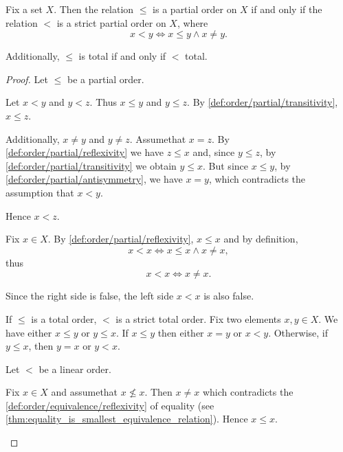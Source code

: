 \begin{proposition}\label{thm:strict_partial_order_conversion}
  Fix a set \( X \). Then the relation \( \leq \) is a partial order on \( X \) if and only if the relation \( < \) is a strict partial order on \( X \), where
  \begin{equation*}
    x < y \iff x \leq y \land x \neq y.
  \end{equation*}

  Additionally, \( \leq \) is total if and only if \( < \) total.
\end{proposition}
\begin{proof}
  \Implies Let \( \leq \) be a partial order.
  \begin{description}
     Let \( x < y \) and \( y < z \). Thus \( x \leq y \) and \( y \leq z \). By \ref{def:order/partial/transitivity}, \( x \leq z \).

    Additionally, \( x \neq y \) and \( y \neq z \). Assume\LEM that \( x = z \). By \ref{def:order/partial/reflexivity} we have \( z \leq x \) and, since \( y \leq z \), by \ref{def:order/partial/transitivity} we obtain \( y \leq x \). But since \( x \leq y \), by \ref{def:order/partial/antisymmetry}, we have \( x = y \), which contradicts the assumption that \( x < y \).

    Hence \( x < z \).

     Fix \( x \in X \). By \ref{def:order/partial/reflexivity}, \( x \leq x \) and by definition,
    \begin{equation*}
      x < x \iff x \leq x \land x \neq x,
    \end{equation*}
    thus
    \begin{equation*}
      x < x \iff x \neq x.
    \end{equation*}

    Since the right side is false, the left side \( x < x \) is also false.

     If \( \leq \) is a total order, \( < \) is a strict total order. Fix two elements \( x, y \in X \). We have either \( x \leq y \) or \( y \leq x \). If \( x \leq y \) then either \( x = y \) or \( x < y \). Otherwise, if \( y \leq x \), then \( y = x \) or \( y < x \).
  \end{description}

  \ImpliedBy Let \( < \) be a linear order.
  \begin{description}
     Fix \( x \in X \) and assume\LEM that \( x \not\leq x \). Then \( x \neq x \) which contradicts the \ref{def:order/equivalence/reflexivity} of equality (see \cref{thm:equality_is_smallest_equivalence_relation}). Hence \( x \leq x \).


\end{description}
\end{proof}
